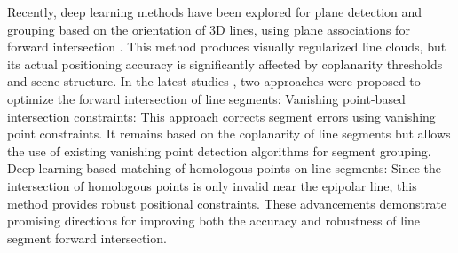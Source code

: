 Recently, deep learning methods have been explored for plane detection and grouping based on the orientation of 3D lines, using plane associations for forward intersection \citep{wang2020reconstruction}. This method produces visually regularized line clouds, but its actual positioning accuracy is significantly affected by coplanarity thresholds and scene structure. In the latest studies \citep{LiuCVPR}, two approaches were proposed to optimize the forward intersection of line segments:
Vanishing point-based intersection constraints: This approach corrects segment errors using vanishing point constraints. It remains based on the coplanarity of line segments but allows the use of existing vanishing point detection algorithms for segment grouping.
Deep learning-based matching of homologous points on line segments: Since the intersection of homologous points is only invalid near the epipolar line, this method provides robust positional constraints.
These advancements demonstrate promising directions for improving both the accuracy and robustness of line segment forward intersection.